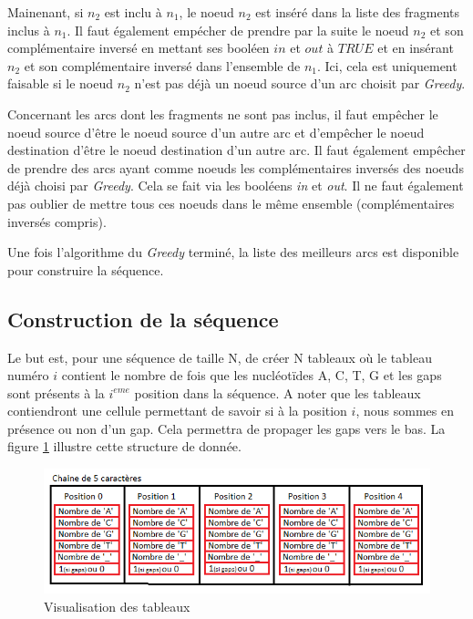 \documentclass[12pt,a4paper,final]{article}
\begin{document}
Mainenant, si $n_2$ est inclu à $n_1$, le noeud $n_2$ est inséré dans la liste des fragments inclus à $n_1$.  Il faut également empécher de prendre par la suite le noeud $n_2$ et son complémentaire inversé en mettant ses booléen $in$ et $out$ à $TRUE$ et en insérant $n_2$ et son complémentaire inversé dans l'ensemble de $n_1$.  Ici, cela est uniquement faisable si le noeud $n_2$ n'est pas déjà un noeud source d'un arc choisit par \textit{Greedy}.\medskip

Concernant les arcs dont les fragments ne sont pas inclus, il faut empêcher le noeud source d'être le noeud source d'un autre arc et d'empêcher le noeud destination d'être le noeud destination d'un autre arc.  Il faut également empêcher de prendre des arcs ayant comme noeuds les complémentaires inversés des noeuds déjà choisi par \textit{Greedy}.  Cela se fait via les booléens \textit{in} et \textit{out}.  Il ne faut également pas oublier de mettre tous ces noeuds dans le même ensemble (complémentaires inversés compris).\medskip

Une fois l'algorithme du \textit{Greedy} terminé, la liste des meilleurs arcs est disponible pour construire la séquence.

\subsection{Construction de la séquence}

Le but est, pour une séquence de taille N, de créer N tableaux où le tableau numéro $i$ contient le nombre de fois que les nucléotïdes A, C, T, G et les gaps sont présents à la $i^{eme}$ position dans la séquence. A noter que les tableaux contiendront une cellule permettant de savoir si à la position $i$, nous sommes en présence ou non d'un gap.  Cela permettra de propager les gaps vers le bas. La figure \ref{table} illustre cette structure de donnée.\medskip

\begin{figure}[!ht]
\centering
	\includegraphics[width=1\textwidth]{images/table.png}
	\caption{\label{table}Visualisation des tableaux}
\end{figure}
\end{document}
